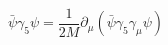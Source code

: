 \begin{equation}
\bar{\psi} \gamma_{5} \psi = \frac{1}{2M} \partial_{\mu} 
(\bar{\psi} \gamma_{5} \gamma_{\mu} \psi)     \nonumber
\end{equation}

